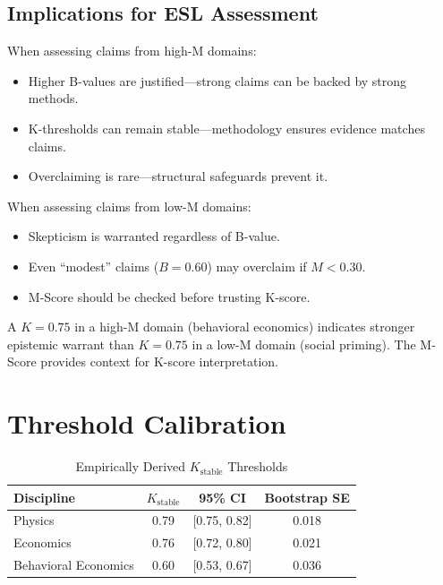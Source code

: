 \documentclass[11pt,a4paper]{article}
\theoremstyle{remark}
\begin{document}
\subsection{Implications for ESL Assessment}

When assessing claims from high-M domains:

\begin{itemize}
    \item Higher B-values are justified---strong claims can be backed by strong methods.
    \item K-thresholds can remain stable---methodology ensures evidence matches claims.
    \item Overclaiming is rare---structural safeguards prevent it.
\end{itemize}

When assessing claims from low-M domains:

\begin{itemize}
    \item Skepticism is warranted regardless of B-value.
    \item Even ``modest'' claims ($B = 0.60$) may overclaim if $M < 0.30$.
    \item M-Score should be checked before trusting K-score.
\end{itemize}

\begin{warningbox}[title={The Domain Calibration Principle}]
A $K = 0.75$ in a high-M domain (behavioral economics) indicates stronger epistemic warrant than $K = 0.75$ in a low-M domain (social priming). The M-Score provides context for K-score interpretation.
\end{warningbox}

\section{Threshold Calibration}
\label{sec:calibration}

\begin{table}[h]
\centering
\caption{Empirically Derived $K_{\text{stable}}$ Thresholds}
\begin{tabular}{lccc}
\toprule
\textbf{Discipline} & \textbf{$K_{\text{stable}}$} & \textbf{95\% CI} & \textbf{Bootstrap SE} \\
\midrule
Physics & 0.79 & [0.75, 0.82] & 0.018 \\
Economics & 0.76 & [0.72, 0.80] & 0.021 \\
Behavioral Economics & 0.60 & [0.53, 0.67] & 0.036 \\
\bottomrule
\end{tabular}
\end{table}
\end{document}
